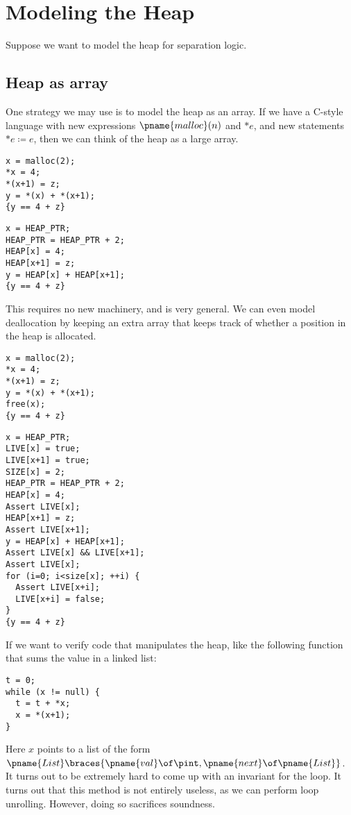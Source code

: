 \documentclass[class=scrartcl]{standalone}
\begin{document}
\section{Modeling the Heap}
Suppose we want to model the heap for separation logic.

\subsection{Heap as array}
One strategy we may use is to model the heap as an array.
If we have a C-style language with new expressions
\(\pname{malloc}(n)\) and \(*e\),
and new statements \(*e \coloneqq e\),
then we can think of the heap as a large array.

\begin{multicols}{2}
\begin{verbatim}
x = malloc(2);
*x = 4;
*(x+1) = z;
y = *(x) + *(x+1);
{y == 4 + z}
\end{verbatim}
\columnbreak
\begin{verbatim}
x = HEAP_PTR;
HEAP_PTR = HEAP_PTR + 2;
HEAP[x] = 4;
HEAP[x+1] = z;
y = HEAP[x] + HEAP[x+1];
{y == 4 + z}
\end{verbatim}
\end{multicols}

This requires no new machinery, and is very general.
We can even model deallocation by keeping an extra
array that keeps track of whether a position in the heap is allocated.
\begin{multicols}{2}
\begin{verbatim}
x = malloc(2);
*x = 4;
*(x+1) = z;
y = *(x) + *(x+1);
free(x);
{y == 4 + z}
\end{verbatim}
\columnbreak
\begin{verbatim}
x = HEAP_PTR;
LIVE[x] = true;
LIVE[x+1] = true;
SIZE[x] = 2;
HEAP_PTR = HEAP_PTR + 2;
HEAP[x] = 4;
Assert LIVE[x];
HEAP[x+1] = z;
Assert LIVE[x+1];
y = HEAP[x] + HEAP[x+1];
Assert LIVE[x] && LIVE[x+1];
Assert LIVE[x];
for (i=0; i<size[x]; ++i) {
  Assert LIVE[x+i];
  LIVE[x+i] = false;
}
{y == 4 + z}
\end{verbatim}
\end{multicols}

If we want to verify code that manipulates the heap,
like the following function that sums the value in a linked list:
\begin{verbatim}
t = 0;
while (x != null) {
  t = t + *x;
  x = *(x+1);
}
\end{verbatim}
Here \(x\) points to a list of the form
\(\pname{List}\braces{{\pname{val}} \of \pint, {\pname{next}} \of \pname{List}}\).
It turns out to be extremely hard
to come up with an invariant for the loop.
It turns out that this method is not entirely useless,
as we can perform loop unrolling.
However, doing so sacrifices soundness.
\end{document}
